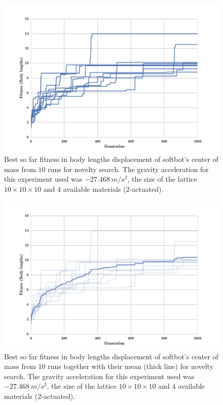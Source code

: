 \begin{figure}[h!]
\centering
\includegraphics[width=1.0\textwidth]{Figures/Results/indRunsSize10Novelty.pdf}
\caption{Best so far fitness in body lengths displacement of softbot's center of mass from $10$ runs for novelty search. The gravity acceleration for this experiment used was $-27.468\   m/s^2$, the size of the lattice $10\times 10\times10$ and $4$ available materials ($2$-actuated).}
\label{fig:indRunsSize10Novelty}
\end{figure}

\begin{figure}[h!]
\centering
\includegraphics[width=1.0\textwidth]{Figures/Results/indRunnAvgSize10Novelty.pdf}
\caption{Best so far fitness in body lengths displacement of softbot's center of mass from $10$ runs together with their mean (thick line) for novelty search. The gravity acceleration for this experiment used was $-27.468\   m/s^2$, the size of the lattice $10\times 10\times10$ and $4$ available materials ($2$-actuated).}
\label{fig:indRunnAvgSize10Novelty}
\end{figure}


